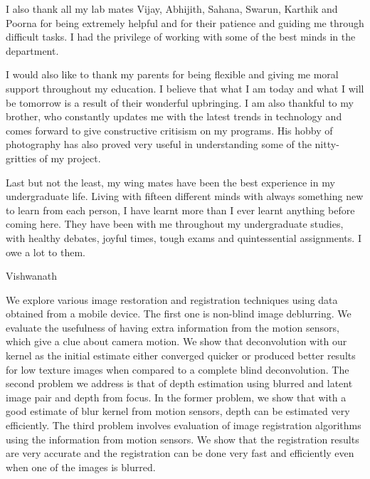 \documentclass[BTech]{iitmdiss}
\begin{document}
I also thank all my lab mates Vijay, Abhijith, Sahana, Swarun, Karthik and 
Poorna for being extremely helpful and for their patience and guiding me through difficult tasks. I had the privilege of working with some of the best minds in the department.

I would also like to thank my parents for being flexible and giving me moral
support throughout my education. I believe that what I am today and what
I will be tomorrow is a result of their wonderful upbringing. I  am also
thankful to my brother, who constantly updates me with the latest trends
in technology and comes forward to give constructive critisism on my
programs. His hobby of photography has also proved very useful in 
understanding some of the nitty-gritties of my project.

Last but not the least, my wing mates have been the best 
experience in my undergraduate life. Living with fifteen different minds
with always something new to learn from each person, I have learnt more
than I ever learnt anything before coming here. They have been with me
throughout my undergraduate studies, with healthy debates, joyful times,
tough exams and quintessential assignments. I owe a lot to them.

Vishwanath

\abstract
We explore various image restoration and registration techniques using 
data obtained from a mobile device. The first one is non-blind image
deblurring. We evaluate the usefulness of having extra information from the motion sensors, which give a clue about camera motion. We
show that deconvolution with our kernel as the 
initial estimate either converged quicker or produced better results for low
texture images when compared to a complete blind deconvolution. The second problem we address is that of depth estimation using blurred and latent image pair and depth from focus. In the former problem, we show that with a good estimate of blur kernel from motion sensors, depth can be estimated very efficiently. The third problem involves evaluation of image registration algorithms using the information from motion sensors. We show that the registration results are very accurate and the registration can be done very fast and efficiently even when one of the images is blurred.

\begin{singlespace}
\tableofcontents
\thispagestyle{empty}

\listoffigures
{}
\end{singlespace}
\pagebreak
\end{document}
